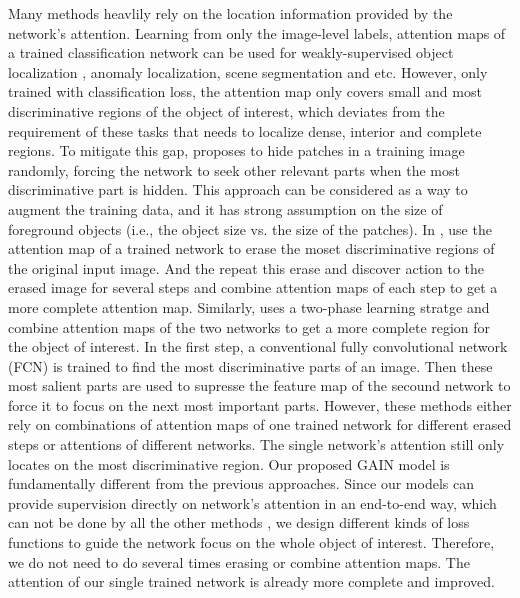 \documentclass[10pt,twocolumn,letterpaper]{article}
\begin{document}
Many methods heavlily rely on the location information provided by the network's attention. Learning from only the image-level labels, attention maps of a trained classification network can be used for weakly-supervised object localization \cite{zhou2016learning,oquab2015object}, anomaly localization, scene segmentation \cite{kolesnikov2016seed} and etc. However, only trained with classification loss, the attention map only covers small and most discriminative regions of the object of interest, which deviates from the requirement of these tasks that needs to localize dense, interior and complete regions. To mitigate this gap, \cite{singh2017hide} proposes to hide patches in a training image randomly, forcing the network to seek other relevant parts when the most discriminative part is hidden. This approach can be considered as a way to augment the training data, and it has strong assumption on the size of foreground objects (i.e., the object size vs. the size of the patches). In \cite{wei2017object}, use the attention map of a trained network to erase the moset discriminative regions of the original input image. And the repeat this erase and discover action to the erased image for several steps and combine attention maps of each step to get a more complete attention map. Similarly, \cite{kim2017two} uses a two-phase learning stratge and combine attention maps of the two networks to get a more complete region for the object of interest. In the first step, a conventional fully convolutional network (FCN) \cite{long2015fully} is trained to find the most discriminative parts of an image. Then these most salient parts are used to supresse the feature map of the secound network to force it to focus on the next most important parts. However, these methods either rely on combinations of attention maps of one trained network for different erased steps or attentions of different networks. The single network's attention still only locates on the most discriminative region. Our proposed GAIN model is fundamentally different from the previous approaches. Since our models can provide supervision directly on network's attention in an end-to-end way, which can not be done by all the other methods \cite{grad-cam,zhou2016learning,wei2017object,zhang2016top,singh2017hide,kim2017two}, we design different kinds of loss functions to guide the network focus on the whole object of interest. Therefore, we do not need to do several times erasing or combine attention maps. The attention of our single trained network is already more complete and improved.
\end{document}
